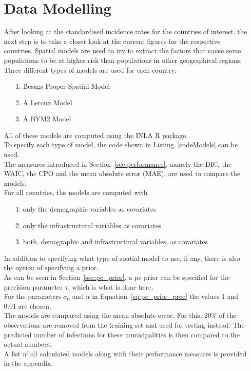 \section{Data Modelling}
After looking at the standardised incidence rates for the countries of interest, the next step is to take a closer look at the current figures for the respective countries. Spatial models are used to try to extract the factors that cause some populations to be at higher risk than populations in other geographical regions. Three different types of models are used for each country:
\begin{itemize}
    \item[1.] Besags Proper Spatial Model
    \item[2.] A Leroux Model
    \item[3.] A BYM2 Model
\end{itemize}
All of these models are computed using the INLA \cite{rinla} R package. \\
To specify each type of model, the code shown in Listing~\ref{codeModels} can be used. \\
The measures introduced in Section~\ref{sec:performance}, namely the DIC, the WAIC, the CPO and the mean absolute error (MAE), are used to compare the models.\\
For all countries, the models are computed with
\begin{itemize}
    \item[1.] only the demographic variables as covariates
    \item[2.] only the infrastructural variables as covariates
    \item[3.] both, demographic and infrastructural variables, as covariates
\end{itemize}
In addition to specifying what type of spatial model to use, if any, there is also the option of specifying a prior. \\
As can be seen in Section~\ref{sec:pc_prior}, a pc prior can be specified for the precision parameter $\tau$, which is what is done here. \\
For the parameters $\sigma_0$ and $\alpha$ in Equation~\ref{eq:pc_prior_prec} the values 1 and 0.01 are chosen. \\
The models are compared using the mean absolute error. For this, 20\% of the observations are removed from the training set and used for testing instead. The predicted number of infections for these municipalities is then compared to the actual numbers.
\\
A list of all calculated models along with their performance measures is provided in the appendix.
